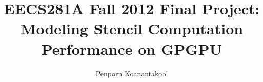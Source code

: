 \documentclass{article}
\title{EECS281A Fall 2012 Final Project: \\ Modeling Stencil Computation Performance on GPGPU}
\author{Penporn Koanantakool}
\begin{document}
\maketitle







\pagebreak


%
%
\end{document}
